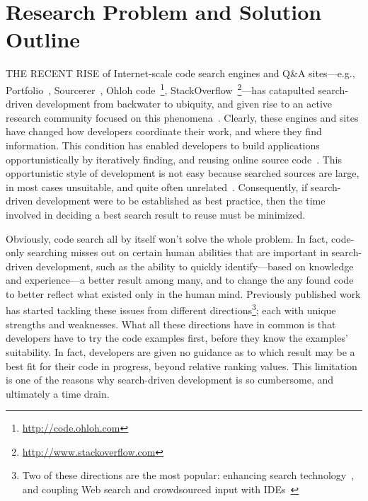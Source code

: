 \documentclass[conference]{IEEEtran}
\begin{document}
\section{Research Problem and Solution Outline}
\label{sec:intro}

\lettrine[lraise=0.1, nindent=0em, slope=-.5em]{T}{HE RECENT RISE} of Internet-scale code search engines and Q\&A sites---e.g., Portfolio~\cite{McMillan:2011wq}, Sourcerer~\cite{Bajracharya:2006vn}, Ohloh code~\footnote{\url{http://code.ohloh.com}}, StackOverflow~\footnote{\url{http://www.stackoverflow.com}}---has catapulted search-driven development from backwater to ubiquity, and given rise to an active research community focused on this phenomena~\cite{Bajracharya:2009fj, Bajracharya:2010iy, Bajracharya:2011kw}. Clearly, these engines and sites have changed how developers coordinate their work, and where they find information. This condition has enabled developers to build applications opportunistically by iteratively finding, and reusing online source code~\cite{Brandt:2008wi, Ncube:2008fm, Brandt:2009jb, McMillan:2012dj}. This opportunistic style of development is not easy because searched sources are large, in most cases unsuitable, and quite often unrelated~\cite{GallardoValencia:2009gr}. Consequently, if search-driven development were to be established as best practice, then the time involved in deciding a best search result to reuse must be minimized.

Obviously, code search all by itself won't solve the whole problem. In fact, code-only searching misses out on certain human abilities that are important in search-driven development, such as the ability to quickly identify---based on knowledge and experience---a better result among many, and to change the any found code to better reflect what existed only in the human mind. Previously published work has started tackling these issues from different directions\footnote{Two of these directions are the most popular: enhancing search technology~\cite{Bajracharya:2010um, Gysin:2010kt, McMillan:2011cm, McMillan:2012dj, Ying:2012tr}, and coupling Web search and crowdsourced input with IDEs~\cite{Bacchelli:2012dl, Brandt:2010tp, Hartmann:2010hx, Hoffmann:2007wo, Oney:2012ge, Wightman:2012gc}}; each with unique strengths and weaknesses. What all these directions have in common is that developers have to try the code examples first, before they know the examples' suitability. In fact, developers are given no guidance as to which result may be a best fit for their code in progress, beyond relative ranking values. This limitation is one of the reasons why search-driven development is so cumbersome, and ultimately a time drain.
\end{document}
